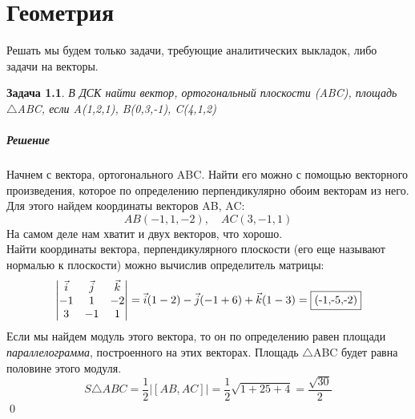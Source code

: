 \documentclass[a4paper,12pt]{report}
\newtheorem{problem}{Задача}[chapter]
\newenvironment{sol}{\paragraph{Решение}}{}
\begin{document}
	\chapter{Геометрия}
	Решать мы будем только задачи, требующие аналитических выкладок, либо задачи на векторы.
	\begin{problem}
		В ДСК найти вектор, ортогональный плоскости (ABC), площадь $\triangle$ABC, если A(1,2,1), B(0,3,-1), C(4,1,2)
	\end{problem}
	\begin{sol}
		Начнем с вектора, ортогонального ABC. Найти его можно с помощью векторного произведения, которое по определению перпендикулярно обоим векторам из него. Для этого найдем координаты векторов AB, AC:
		\[
		AB(-1,1,-2),\quad AC(3,-1,1)
		\]
		На самом деле нам хватит и двух векторов, что хорошо.\\
		
		Найти координаты вектора, перпендикулярного плоскости (его еще называют нормалью к плоскости) можно вычислив определитель матрицы:
		\begin{equation*}
			\begin{vmatrix}
				\vec{i} & \vec{j} & \vec{k}\\
				-1 & 1 & -2\\
				3 & -1 & 1
			\end{vmatrix}=\vec{i}(1-2)-\vec{j}(-1+6)+\vec{k}(1-3)=\fbox{(-1,-5,-2)}
		\end{equation*}
		Если мы найдем модуль этого вектора, то он по определению равен площади \textit{параллелограмма}, построенного на этих векторах. Площадь $\triangle$ABC будет равна половине этого модуля.
		\begin{equation*}
			S\triangle ABC = \frac{1}{2}|[AB,AC]|=\frac{1}{2}\sqrt{1+25+4}=\frac{\sqrt{30}}{2}
		\end{equation*}
		\qed
	\end{sol}
	
\end{document}

